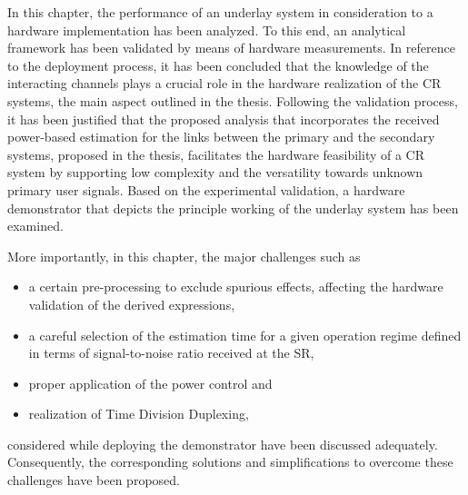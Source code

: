 In this chapter, the performance of an underlay system in consideration to a hardware implementation has been analyzed. To this end, an analytical framework has been validated by means of hardware measurements. 
In reference to the deployment process, it has been concluded that the knowledge of the interacting channels plays a crucial role in the hardware realization of the CR systems, the main aspect outlined in the thesis. Following the validation process, it has been justified that the proposed analysis that incorporates the received power-based estimation for the links between the primary and the secondary systems, proposed in the thesis, facilitates the hardware feasibility of a CR system by supporting low complexity and the versatility towards unknown primary user signals. Based on the experimental validation, a hardware demonstrator that depicts the principle working of the underlay system has been examined. 

More importantly, in this chapter, the major challenges such as \begin{itemize} \item a certain pre-processing to exclude spurious effects, affecting the hardware validation of the derived expressions, \item a careful selection of the estimation time for a given operation regime defined in terms of signal-to-noise ratio received at the SR, \item proper application of the power control and \item realization of Time Division Duplexing, \end{itemize} considered while deploying the demonstrator have been discussed adequately. Consequently, the corresponding solutions and simplifications to overcome these challenges have been proposed.  














